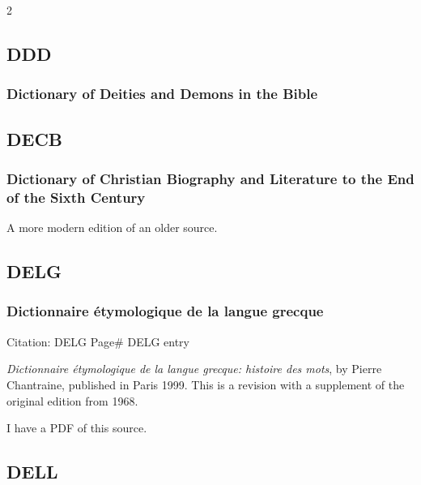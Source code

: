 \begin{multicols}{2}
			\phantom{.}
			
	\subsection*{DDD}
	
		\subsubsection*{Dictionary of Deities and Demons in the Bible}
		
			\phantom{.}
			
	\subsection*{DECB}
	
		\subsubsection*{Dictionary of Christian Biography and Literature to the End of the Sixth Century}
		
			A more modern edition of an older source.
			
	\subsection*{DELG}
	
		\subsubsection*{Dictionnaire étymologique de la langue grecque}
		
			Citation:
				DELG Page\#
				DELG entry
		
			\textit{Dictionnaire étymologique de la langue grecque: histoire des mots}, by Pierre Chantraine, published in Paris 1999. This is a revision with a supplement of the original edition from 1968.
			
			I have a PDF of this source.
			
	\subsection*{DELL}
	

\end{multicols}
